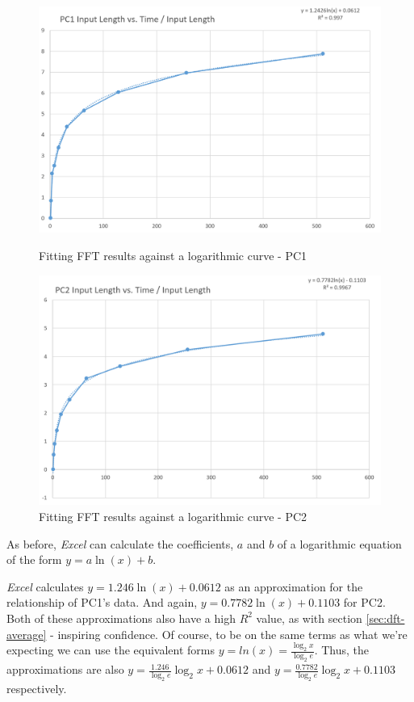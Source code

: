 \documentclass[]{article}
\begin{document}
\begin{figure}[!htbp]
	\centering
	\begin{minipage}[b]{0.4\textwidth}
		\includegraphics[width=\linewidth]{csv/pc1-fft-fit}
		\caption{Fitting FFT results against a logarithmic curve - PC1\label{fig:pc1-fft-fit}}
	\end{minipage}
	\hfill
	\begin{minipage}[b]{0.4\textwidth}
		\includegraphics[width=\linewidth]{csv/pc2-fft-fit}
		\caption{Fitting FFT results against a logarithmic curve - PC2\label{fig:pc2-fft-fit}}
	\end{minipage}
\end{figure}

As before, \emph{Excel} can calculate the coefficients, $a$ and $b$ of a logarithmic equation of the form $y = a\ln(x) + b$.

\emph{Excel} calculates $y = 1.246\ln(x) + 0.0612$ as an approximation for the relationship of PC1's data. And again, $y = 0.7782\ln(x) + 0.1103$ for PC2. Both of these approximations also have a high $R^2$ value, as with section \ref{sec:dft-average} - inspiring confidence. Of course, to be on the same terms as what we're expecting we can use the equivalent forms $y = ln(x) = \frac{\log_2{x}}{\log_2{e}}$. Thus, the approximations are also $y = \frac{1.246}{\log_2{e}}\log_2{x} + 0.0612$ and $y = \frac{0.7782}{\log_2{e}}\log_2{x} + 0.1103$ respectively.
\end{document}
